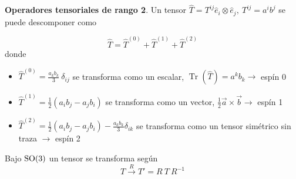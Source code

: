 \begin{flushleft}
\textbf{Operadores tensoriales de rango 2}. Un tensor $\widehat{T}=T^{ij} \hat{e}_i \otimes \hat{e}_j,\ T^{ij}=a^ib^j$ se puede descomponer como
\end{flushleft}
\begin{equation}
\widehat{T}=\widehat{T}^{(0)}+\widehat{T}^{(1)}+\widehat{T}^{(2)}
\end{equation}
donde
\begin{itemize}
\item $\widehat{T}^{(0)}=\frac{a_k b_k}{3}\ \delta_{ij}$ se transforma como un escalar, $\operatorname{Tr}(\widehat{T})=a^kb_k\longrightarrow$ espín 0
\item $\widehat{T}^{(1)}=\frac{1}{2}(a_ib_j-a_jb_i)$ se transforma como un vector, $\frac{1}{2} \vec{a}\times \vec{b}\longrightarrow$ espín 1
\item $\widehat{T}^{(2)}=\frac{1}{2}(a_ib_j-a_jb_i)-\frac{a_kb_k}{3} \delta_{ik}$ se transforma como un tensor simétrico sin traza $\longrightarrow$ espín 2
\end{itemize}
\bigskip 

Bajo $\mathrm{SO}(3)$ un tensor se transforma según
\begin{equation}
T\xrightarrow{R} T'=R\ T\ R^{-1}
\end{equation}